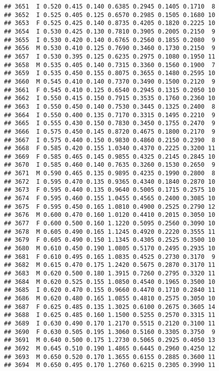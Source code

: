 \documentclass[
]{article}
\begin{document}
\begin{verbatim}
## 3651  I 0.520 0.415 0.140 0.6385 0.2945 0.1405 0.1710  8
## 3652  I 0.525 0.405 0.125 0.6570 0.2985 0.1505 0.1680 10
## 3653  F 0.525 0.425 0.140 0.8735 0.4205 0.1820 0.2225 10
## 3654  I 0.530 0.425 0.130 0.7810 0.3905 0.2005 0.2150  9
## 3655  I 0.530 0.420 0.140 0.6765 0.2560 0.1855 0.2080  9
## 3656  M 0.530 0.410 0.125 0.7690 0.3460 0.1730 0.2150  9
## 3657  I 0.530 0.395 0.125 0.6235 0.2975 0.1080 0.1950 11
## 3658  M 0.535 0.405 0.140 0.7315 0.3360 0.1560 0.1900  7
## 3659  I 0.535 0.450 0.155 0.8075 0.3655 0.1480 0.2595 10
## 3660  M 0.545 0.410 0.140 0.7370 0.3490 0.1500 0.2120  9
## 3661  F 0.545 0.410 0.125 0.6540 0.2945 0.1315 0.2050 10
## 3662  I 0.550 0.415 0.150 0.7915 0.3535 0.1760 0.2360 10
## 3663  I 0.550 0.450 0.140 0.7530 0.3445 0.1325 0.2400  8
## 3664  I 0.550 0.400 0.135 0.7170 0.3315 0.1495 0.2210  9
## 3665  I 0.555 0.430 0.150 0.7830 0.3450 0.1755 0.2470  9
## 3666  I 0.575 0.450 0.145 0.8720 0.4675 0.1800 0.2170  9
## 3667  I 0.575 0.440 0.150 0.9830 0.4860 0.2150 0.2390  8
## 3668  F 0.585 0.420 0.155 1.0340 0.4370 0.2225 0.3200 11
## 3669  F 0.585 0.465 0.145 0.9855 0.4325 0.2145 0.2845 10
## 3670  I 0.585 0.460 0.140 0.7635 0.3260 0.1530 0.2650  9
## 3671  M 0.590 0.465 0.135 0.9895 0.4235 0.1990 0.2800  8
## 3672  I 0.595 0.470 0.135 0.9365 0.4340 0.1840 0.2870 10
## 3673  F 0.595 0.440 0.135 0.9640 0.5005 0.1715 0.2575 10
## 3674  F 0.595 0.460 0.155 1.0455 0.4565 0.2400 0.3085 10
## 3675  F 0.595 0.450 0.165 1.0810 0.4900 0.2525 0.2790 12
## 3676  M 0.600 0.470 0.160 1.0120 0.4410 0.2015 0.3050 10
## 3677  F 0.600 0.500 0.160 1.1220 0.5095 0.2560 0.3090 10
## 3678  M 0.605 0.490 0.165 1.1245 0.4920 0.2220 0.3555 11
## 3679  F 0.605 0.490 0.150 1.1345 0.4305 0.2525 0.3500 10
## 3680  M 0.610 0.450 0.190 1.0805 0.5170 0.2495 0.2935 10
## 3681  F 0.610 0.495 0.165 1.0835 0.4525 0.2730 0.3170  9
## 3682  M 0.615 0.470 0.175 1.2420 0.5675 0.2870 0.3170 11
## 3683  M 0.620 0.500 0.180 1.3915 0.7260 0.2795 0.3320 11
## 3684  M 0.620 0.525 0.155 1.0850 0.4540 0.1965 0.3500 10
## 3685  I 0.620 0.470 0.155 0.9660 0.4470 0.1710 0.2840 11
## 3686  M 0.620 0.480 0.165 1.0855 0.4810 0.2575 0.3050 10
## 3687  F 0.625 0.485 0.135 1.3025 0.6100 0.2675 0.3605 14
## 3688  I 0.625 0.485 0.160 1.1500 0.5255 0.2570 0.3315 11
## 3689  I 0.630 0.490 0.170 1.2170 0.5515 0.2120 0.3100 11
## 3690  F 0.630 0.505 0.195 1.3060 0.5160 0.3305 0.3750  9
## 3691  M 0.640 0.500 0.175 1.2730 0.5065 0.2925 0.4050 13
## 3692  M 0.645 0.510 0.190 1.4865 0.6445 0.2960 0.4250 12
## 3693  M 0.650 0.520 0.170 1.3655 0.6155 0.2885 0.3600 11
## 3694  M 0.650 0.495 0.170 1.2760 0.6215 0.2305 0.3990 11

\end{verbatim}
\end{document}
